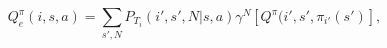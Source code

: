 \begin{equation}
    Q_e^{\pi}(i, s, a) = \sum_{s', N} P_{T_i}(i', s', N|s, a)\gamma^N[Q^{\pi}(i', s', \pi_{i'}(s')],
    \label{eq:OptQe}
\end{equation}

